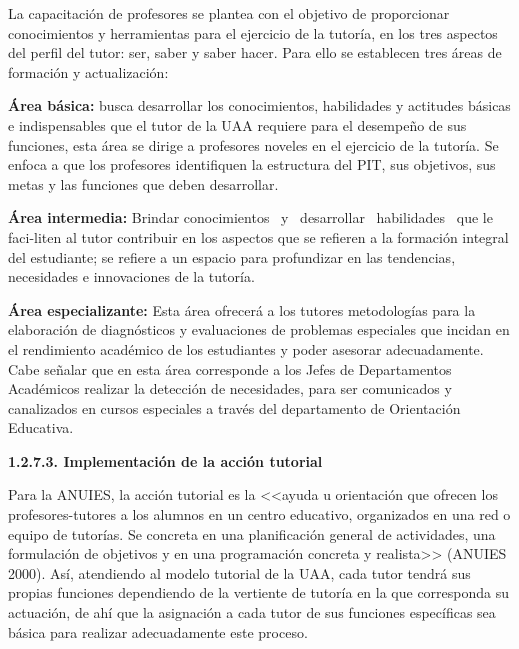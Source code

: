 La capacitación de profesores se plantea con el objetivo de proporcionar
conocimientos y herramientas para el ejercicio de la tutoría, en los tres
aspectos del perfil del tutor: ser, saber y saber hacer. Para ello se
establecen tres áreas de formación y actualización:

\begin{Obs}
\item[{\bf Área básica:}] busca desarrollar los conocimientos, habilidades y
actitudes básicas e indispensables que el tutor de la UAA requiere para el
desempeño de sus funciones, esta área se dirige a profesores noveles en el
ejercicio de la tutoría. Se enfoca a que los profesores identifiquen la
estructura del PIT, sus objetivos, sus metas y las funciones que deben
desarrollar.

\item[{\bf Área intermedia:}] Brindar cono\-cimien\-tos \ y \ de\-sa\-rro\-llar \ ha\-bi\-li\-da\-des \ que le faci-li\-ten al tutor contribuir en los aspectos que se refieren a la
formación integral del estudiante; se refiere a un espacio para profundizar
en las tendencias, necesidades e innovaciones de la tutoría.

\item[{\bf Área especializante:}] Esta área ofrecerá a los tutores
metodologías para la elaboración de diagnósticos y evaluaciones de
problemas especiales que incidan en el rendimiento académico de los
estudiantes y poder asesorar adecuadamente. Cabe señalar que en esta área
corresponde a los Jefes de Departamentos Académicos realizar la detección
de necesidades, para ser comunicados y canalizados en cursos especiales a
través del departamento de Orientación Educativa.
\end{Obs}

\medskip
{\bfseries 1.2.7.3. Implementación de la acción tutorial}
\enlargethispage{1\baselineskip}

Para la ANUIES, la acción tutorial es la <<ayuda u orientación que ofrecen
los profesores-tutores a los alumnos en un centro educativo, organizados en
una red o equipo de tutorías. Se concreta en una planificación general de
actividades, una formulación de objetivos y en una programación concreta y
realista>> (ANUIES 2000). Así, atendiendo al modelo tutorial de la UAA,
cada tutor tendrá sus propias funciones dependiendo de la vertiente de
tutoría en la que corresponda su actuación, de ahí que la asignación a cada
tutor de sus funciones específicas sea básica para realizar adecuadamente
este proceso.

